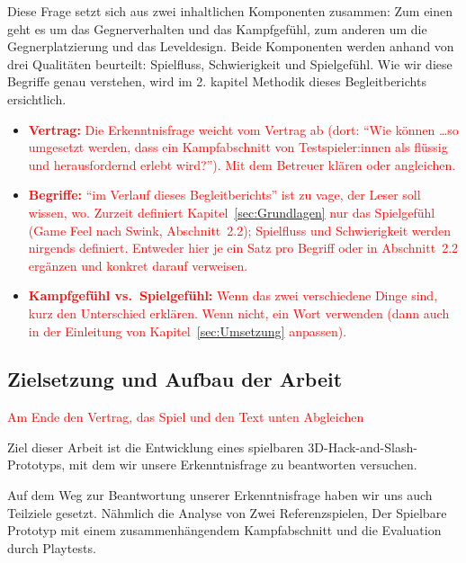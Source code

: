 \documentclass[../Main.tex]{subfiles}
\begin{document}
\vspace{\baselineskip}

Diese Frage setzt sich aus zwei inhaltlichen Komponenten zusammen: Zum einen geht es um das Gegnerverhalten und das Kampfgefühl, zum anderen um die Gegnerplatzierung und das Leveldesign. Beide Komponenten werden anhand von drei Qualitäten beurteilt: Spielfluss, Schwierigkeit und Spielgefühl. Wie wir diese Begriffe genau verstehen, wird im 2. kapitel Methodik dieses Begleitberichts ersichtlich.

\begin{itemize}[leftmargin=1.5cm]
    \item \textcolor{red}{\textbf{Vertrag:} Die Erkenntnisfrage weicht vom Vertrag ab (dort: \enquote{Wie können \ldots so umgesetzt werden, dass ein Kampfabschnitt von Testspieler:innen als flüssig und herausfordernd erlebt wird?}). Mit dem Betreuer klären oder angleichen.}
    \item \textcolor{red}{\textbf{Begriffe:} \enquote{im Verlauf dieses Begleitberichts} ist zu vage, der Leser soll wissen, wo. Zurzeit definiert Kapitel~\ref{sec:Grundlagen} nur das Spielgefühl (Game Feel nach Swink, Abschnitt~2.2); Spielfluss und Schwierigkeit werden nirgends definiert. Entweder hier je ein Satz pro Begriff oder in Abschnitt~2.2 ergänzen und konkret darauf verweisen.}
    \item \textcolor{red}{\textbf{Kampfgefühl vs.\ Spielgefühl:} Wenn das zwei verschiedene Dinge sind, kurz den Unterschied erklären. Wenn nicht, ein Wort verwenden (dann auch in der Einleitung von Kapitel~\ref{sec:Umsetzung} anpassen).}
\end{itemize}

\subsection{Zielsetzung und Aufbau der Arbeit} \label{sec:Aufbau}

\textcolor{red}{Am Ende den Vertrag, das Spiel und den Text unten Abgleichen}

Ziel dieser Arbeit ist die Entwicklung eines spielbaren 3D-Hack-and-Slash-Prototyps, mit dem wir unsere Erkenntnisfrage zu beantworten versuchen.

Auf dem Weg zur Beantwortung unserer Erkenntnisfrage haben wir uns auch Teilziele gesetzt. Nähmlich die Analyse von Zwei Referenzspielen, Der Spielbare Prototyp mit einem zusammenhängendem Kampfabschnitt und die Evaluation durch Playtests.
\end{document}
